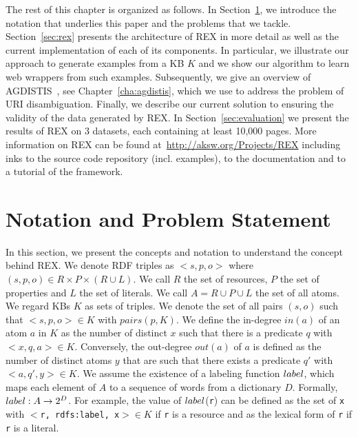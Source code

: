 The rest of this chapter is organized as follows. 
In Section~\ref{sec:notation}, we introduce the notation that underlies this paper and the problems that we tackle. 
Section~\ref{sec:rex} presents the architecture of REX in more detail as well as the current implementation of each of its components.
In particular, we illustrate our approach to generate examples from a  \ac{KB} $K$ and we show our algorithm to learn web wrappers from such examples.
Subsequently, we give an overview of AGDISTIS~\cite{agdistis_iswc}, see Chapter~\ref{cha:agdistis}, which we use to address the problem of URI disambiguation. 
Finally, we describe our current solution to ensuring the validity of the data generated by REX. 
In Section~\ref{sec:evaluation} we present the results of REX on 3 datasets, each containing at least 10,000 pages. 
More information on REX can be found at~\url{http://aksw.org/Projects/REX} including inks to the source code repository (incl. examples), to the documentation and to a tutorial of the framework.

\section{Notation and Problem Statement}
\label{sec:notation}
In this section, we present the concepts and notation to understand the concept behind REX. We denote \ac{RDF} triples as $<s, p, o>$ where $(s, p, o) \in R \times P \times (R \cup L)$. We call $R$ the set of resources, $P$ the set of properties and $L$ the set of literals. We call $A = R \cup P \cup L$ the set of all atoms. We regard  \ac{KB}s $K$ as sets of triples. We denote the set of all pairs $(s, o)$ such that $<s, p, o> \in K$ with $pairs(p, K)$.
We define the in-degree $in(a)$ of an atom $a$ in $K$ as the number of distinct $x$ such that there is a predicate $q$ with $<x, q, a> \in K$. Conversely, the out-degree $out(a)$ of $a$ is defined as the number of distinct atoms $y$ that are such that there exists a predicate $q'$ with $<a, q', y> \in K$.
We assume the existence of a labeling function $label$, which maps each element of $A$ to a sequence of words from a dictionary $D$. Formally, $label: A \rightarrow 2^D$. For example, the value of $label$(\texttt{r}) can be defined as the set of \texttt{x} with $<$\texttt{r, rdfs:label, x}$> \in K$ if \texttt{r} is a resource and as the lexical form of  \texttt{r} if  \texttt{r} is a literal.

